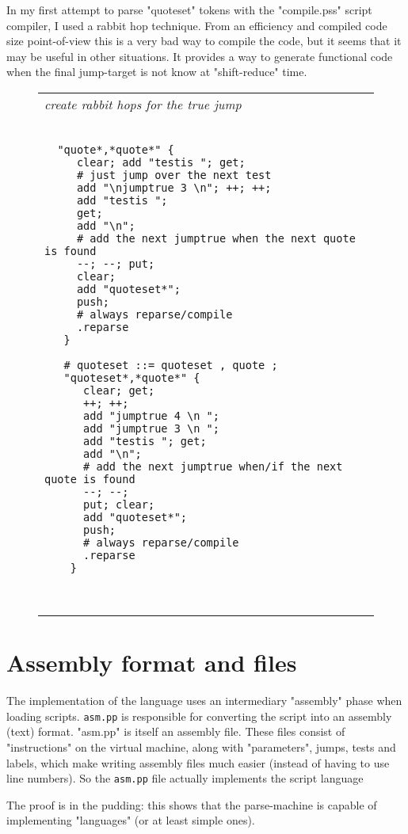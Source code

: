 \documentclass[a4paper,12pt]{article}
\begin{document}
  In my first attempt to parse "quoteset" tokens with the "compile.pss"
  script compiler, I used a rabbit hop technique. From an efficiency
  and compiled code size point-of-view this is a very bad way to
  compile the code, but it seems that it may be useful in other
  situations. It provides a way to generate functional code when
  the final jump-target is not know at "shift-reduce" time.
 \begin{figure}
 \begin{tabular}{ l }
 \emph{ create rabbit hops for the true jump } \\ 
 \begin{lstlisting}[breaklines] 

  "quote*,*quote*" {
     clear; add "testis "; get;
     # just jump over the next test
     add "\njumptrue 3 \n"; ++; ++;
     add "testis ";
     get;
     add "\n";
     # add the next jumptrue when the next quote is found
     --; --; put;
     clear;
     add "quoteset*";
     push;
     # always reparse/compile
     .reparse
   }
     
   # quoteset ::= quoteset , quote ;
   "quoteset*,*quote*" {
      clear; get;
      ++; ++;
      add "jumptrue 4 \n ";
      add "jumptrue 3 \n ";
      add "testis "; get;
      add "\n";
      # add the next jumptrue when/if the next quote is found
      --; --;
      put; clear;
      add "quoteset*";
      push;
      # always reparse/compile
      .reparse
    }

  
 \end{lstlisting} 
 \end{tabular} 

 \end{figure}


\section{Assembly format and files}

  The implementation of the language uses an intermediary "assembly"
  phase when loading scripts. \texttt{asm.pp} is responsible for converting
  the script into an assembly (text) format. "asm.pp" is itself an
  assembly file. These files consist of "instructions" on the virtual
  machine, along with "parameters", jumps, tests and labels, which make
  writing assembly files much easier (instead of having to use line
  numbers). So the \texttt{asm.pp} file actually implements the script language

  The proof is in the pudding: this shows that the parse-machine is
  capable of implementing "languages" (or at least simple ones).
\end{document}
